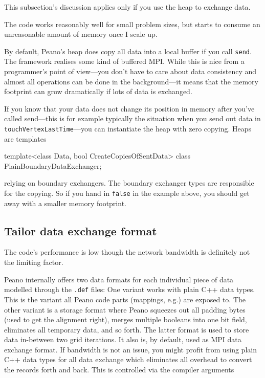 This subsection's discussion applies only if you use the heap to exchange data.

\begin{smell}
  The code works reasonably well for small problem sizes, but starts to consume 
  an unreasonable amount of memory once I scale up.
\end{smell}

\noindent
By default, Peano's heap does copy all data into a local buffer if you call \texttt{send}.
The framework realises some kind of buffered MPI.
While this is nice from a programmer's point of view---you don't have to care about
data consistency and almost all operations can be done in the background---it means
that the memory footprint can grow dramatically if lots of data is exchanged.


If you know that your data does not change its position in memory after you've 
called send---this is for example typically the situation when you send out data in 
\texttt{touchVertexLastTime}---you can instantiate the heap with zero copying.
Heaps are templates
\begin{code}
template<class Data, bool CreateCopiesOfSentData>
class PlainBoundaryDataExchanger;
\end{code} 
relying on boundary exchangers. The boundary exchanger types are responsible 
for the copying. 
So if you hand in \texttt{false} in the example above, you should get away
with a smaller memory footprint.




\subsection{Tailor data exchange format}

\begin{smell}
 The code's performance is low though the network bandwidth is definitely not
 the limiting factor.
\end{smell}


Peano internally offers two data formats for each individual piece of data
modelled through the \texttt{.def} files:
One variant works with plain C++ data types. 
This is the variant all Peano code parts (mappings, e.g.) are exposed to.
The other variant is a  storage format where Peano squeezes out
all padding bytes (used to get the alignment right), merges multiple booleans
into one bit field, eliminates all temporary data, and so forth.
The latter format is used to store data in-between two grid iterations.
It also is, by default, used as MPI data exchange format.
If bandwidth is not an issue, you might profit from using plain C++ data types
for all data exchange which eliminates all overhead to convert the records forth
and back.
This is controlled via the compiler arguments

